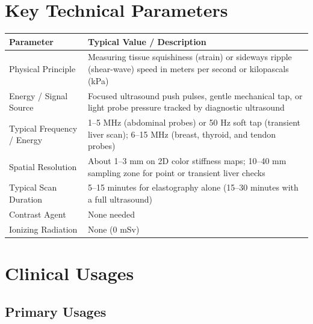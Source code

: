 \section{Key Technical Parameters}

\noindent
\begin{tabularx}{\textwidth}{@{}l X@{}}
\toprule
\textbf{Parameter} & \textbf{Typical Value / Description} \\
\midrule
Physical Principle & Measuring tissue squishiness (strain) or sideways ripple (shear-wave) speed in meters per second or kilopascals (kPa) \\
Energy / Signal Source & Focused ultrasound push pulses, gentle mechanical tap, or light probe pressure tracked by diagnostic ultrasound \\
Typical Frequency / Energy & 1--5 MHz (abdominal probes) or 50 Hz soft tap (transient liver scan); 6--15 MHz (breast, thyroid, and tendon probes) \\
Spatial Resolution & About 1--3 mm on 2D color stiffness maps; 10--40 mm sampling zone for point or transient liver checks \\
Typical Scan Duration & 5--15 minutes for elastography alone (15--30 minutes with a full ultrasound) \\
Contrast Agent & None needed \\
Ionizing Radiation & None (0 mSv) \\
\bottomrule
\end{tabularx}

\section{Clinical Usages}

\subsection{Primary Usages}


